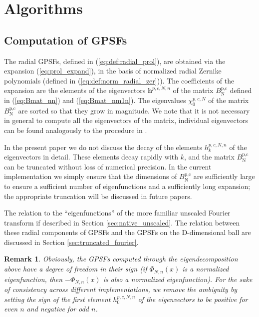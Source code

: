 \documentclass[12pt]{article}
\newtheorem{remark}{Remark}
\begin{document}
\section{Algorithms}\label{sec:alg}


%
%
%
\subsection{Computation of GPSFs}

The radial GPSFs, defined in (\ref{eq:def:radial_prol}), are obtained via the expansion (\ref{eq:prol_expand}), in the basis of normalized radial Zernike polynomials (defined in (\ref{eq:def:norm_radial_zer})).
The coefficients of the expansion are the elements of the eigenvectors ${\bm h}^{p,c,N,n}$ of the matrix $B_{\text{N}}^{\text{p,c}}$ defined in (\ref{eq:Bmat_nn}) and (\ref{eq:Bmat_nm1n}). 
The eigenvalues $\chi^{p,c,N}_0$ of the matrix $B_{\text{N}}^{\text{p,c}}$ are sorted so that they grow in magnitude. 
We note that it is not necessary in general to compute all the eigenvectors of the matrix, 
individual eigenvectors can be found analogously to the procedure in \cite{LedermanLaplace2014}.

In the present paper we do not discuss the decay of the elements ${h}^{p,c,N,n}_k$ of the eigenvectors in detail. These elements decay rapidly with $k$, and the matrix $B_{\text{N}}^{\text{p,c}}$ can be truncated without loss of numerical precision. 
In the current implementation we simply ensure that the dimensions of $B_{\text{N}}^{\text{p,c}}$ are sufficiently large to ensure a sufficient number of eigenfunctions and a sufficiently long expansion; 
the appropriate truncation will be discussed in future papers. 

The relation to the ``eigenfunctions'' of the more familiar unscaled Fourier transform
if described in Section \ref{sec:native_unscaled}.
The relation between these radial components of GPSFs and the GPSFs on the D-dimensional ball 
are discussed in Section \ref{sec:truncated_fourier}.

\begin{remark}
Obviously,  the GPSFs computed through the eigendecomposition above have a degree of freedom in their sign (if $\Phi_{N,n}(x)$ is a normalized eigenfunction, then $-\Phi_{N,n}(x)$ is also a normalized eigenfunction). 
For the sake of consistency across different implementations, we remove the ambiguity by setting the sign of the first element ${h}^{p,c,N,n}_0$ of the eigenvectors to be positive for even $n$ and negative for odd $n$. 
\end{remark}
\end{document}
